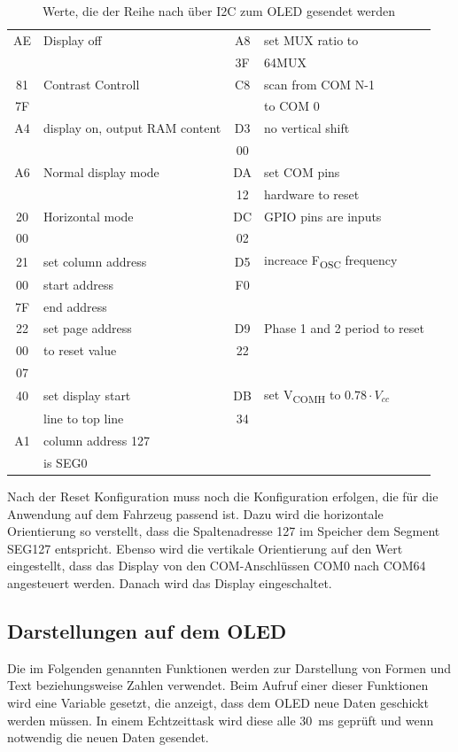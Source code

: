 \begin{table}[H]
\centering
	\begin{tabular}{|c|l||c|l|}
	\hline
	AE&Display off&A8&set MUX ratio to\\
	&&3F&64MUX\\
	\hline
	81&Contrast Controll&C8&scan from COM N-1\\
	7F&&&to COM 0\\
	\hline
	A4&display on, output RAM content&D3&no vertical shift\\
	&&00&\\
	\hline
	A6&Normal display mode&DA&set COM pins\\
	&&12&hardware to reset\\
	\hline
	20&Horizontal mode&DC&GPIO pins are inputs\\
	00&&02&\\
	\hline
	21&set column address&D5&increace F\textsubscript{OSC} frequency\\
	00&start address&F0&\\
	7F&end address&&\\
	\hline
	22&set page address&D9&Phase 1 and 2 period to reset\\
	00&to reset value&22&\\
	07&&&\\
	\hline
	40&set display start&DB&set V\textsubscript{COMH} to $0.78 \cdot V_{cc}$\\
	&line to top line&34&\\
	\hline
	A1&column address 127&&\\
	&is SEG0&&\\
	\hline
	\end{tabular}
	\caption[Initialisierungswert \ac{OLED}]{Werte, die der Reihe nach über \ac{I2C} zum \ac{OLED} gesendet werden}
	\label{tab:InitOLED}
\end{table}
Nach der Reset Konfiguration muss noch die Konfiguration erfolgen, die für die Anwendung auf dem Fahrzeug passend ist. Dazu wird die horizontale Orientierung so verstellt, dass die Spaltenadresse 127 im Speicher dem Segment SEG127 entspricht. Ebenso wird die vertikale Orientierung auf den Wert eingestellt, dass das Display von den COM-Anschlüssen COM0 nach COM64 angesteuert werden. Danach wird das Display eingeschaltet.
\subsection{Darstellungen auf dem \acl{OLED}}\label{sec:OLEDDarstellen}
Die im Folgenden genannten Funktionen werden zur Darstellung von Formen und Text beziehungsweise Zahlen verwendet. Beim Aufruf einer dieser Funktionen wird eine Variable gesetzt, die anzeigt, dass dem \ac{OLED} neue Daten geschickt werden müssen. In einem Echtzeittask wird diese alle \SI{30}{\milli\second} geprüft und wenn notwendig die neuen Daten gesendet. 
